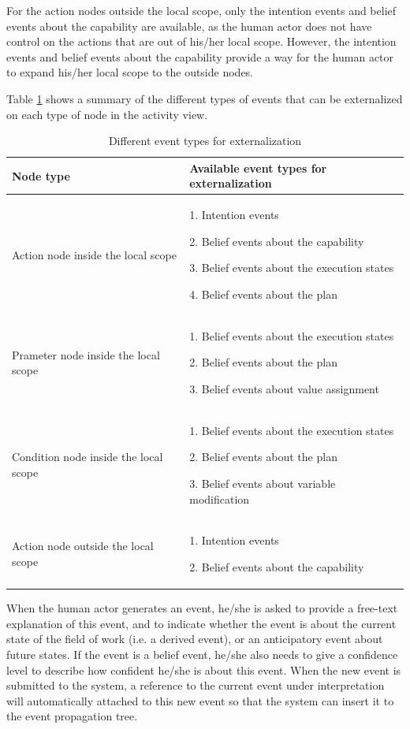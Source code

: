 For the action nodes outside the local scope, only the intention events and belief events about the capability are available, as the human actor does not have control on the actions that are out of his/her local scope. However, the intention events and belief events about the capability provide a way for the human actor to expand his/her local scope to the outside nodes.

Table \ref{tab:event_types_for_externalization} shows a summary of the different types of events that can be externalized on each type of node in the activity view. 


\begin{table}[htbp]
\centering
\footnotesize
\begin{tabular}{>{\raggedright}p{1.5in}>{\raggedright}p{2.6in}}
\toprule 
\textbf{Node type} & \textbf{Available event types for externalization}\tabularnewline
\midrule 
Action node inside the local scope & 1. Intention events

2. Belief events about the capability

3. Belief events about the execution states

4. Belief events about the plan\tabularnewline
\midrule 
Prameter node inside the local scope & 1. Belief events about the execution states

2. Belief events about the plan

3. Belief events about value assignment\tabularnewline
\midrule 
Condition node inside the local scope & 1. Belief events about the execution states

2. Belief events about the plan

3. Belief events about variable modification\tabularnewline
\midrule 
Action node outside the local scope & 1. Intention events

2. Belief events about the capability\tabularnewline
\bottomrule
\end{tabular}	
\caption{Different event types for externalization}
\label{tab:event_types_for_externalization}
\end{table}

When the human actor generates an event, he/she is asked to provide a free-text explanation of this event, and to indicate whether the event is about the current state of the field of work (i.e. a derived event), or an anticipatory event about future states. If the event is a belief event, he/she also needs to give a confidence level to describe how confident he/she is about this event. When the new event is submitted to the system, a reference to the current event under interpretation will automatically attached to this new event so that the system can insert it to the event propagation tree.

